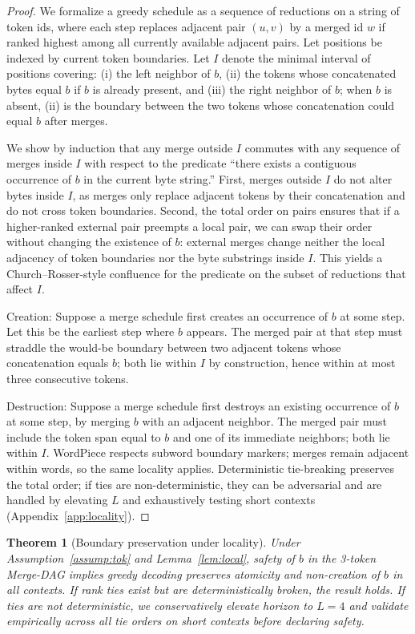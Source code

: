 \documentclass{article}
\newtheorem{theorem}{Theorem}
\begin{document}
\begin{proof}
We formalize a greedy schedule as a sequence of reductions on a string of token ids, where each step replaces adjacent pair $(u,v)$ by a merged id $w$ if ranked highest among all currently available adjacent pairs. Let positions be indexed by current token boundaries. Let $I$ denote the minimal interval of positions covering: (i) the left neighbor of $b$, (ii) the tokens whose concatenated bytes equal $b$ if $b$ is already present, and (iii) the right neighbor of $b$; when $b$ is absent, (ii) is the boundary between the two tokens whose concatenation could equal $b$ after merges.

We show by induction that any merge outside $I$ commutes with any sequence of merges inside $I$ with respect to the predicate “there exists a contiguous occurrence of $b$ in the current byte string.” First, merges outside $I$ do not alter bytes inside $I$, as merges only replace adjacent tokens by their concatenation and do not cross token boundaries. Second, the total order on pairs ensures that if a higher-ranked external pair preempts a local pair, we can swap their order without changing the existence of $b$: external merges change neither the local adjacency of token boundaries nor the byte substrings inside $I$. This yields a Church–Rosser-style confluence for the predicate on the subset of reductions that affect $I$. 

Creation: Suppose a merge schedule first creates an occurrence of $b$ at some step. Let this be the earliest step where $b$ appears. The merged pair at that step must straddle the would-be boundary between two adjacent tokens whose concatenation equals $b$; both lie within $I$ by construction, hence within at most three consecutive tokens.

Destruction: Suppose a merge schedule first destroys an existing occurrence of $b$ at some step, by merging $b$ with an adjacent neighbor. The merged pair must include the token span equal to $b$ and one of its immediate neighbors; both lie within $I$. WordPiece respects subword boundary markers; merges remain adjacent within words, so the same locality applies. Deterministic tie-breaking preserves the total order; if ties are non-deterministic, they can be adversarial and are handled by elevating $L$ and exhaustively testing short contexts (Appendix~\ref{app:locality}).
\end{proof}

\begin{theorem}[Boundary preservation under locality]\label{thm:bpe}
Under Assumption~\ref{assump:tok} and Lemma~\ref{lem:local}, safety of $b$ in the 3-token Merge-DAG implies greedy decoding preserves atomicity and non-creation of $b$ in all contexts. If rank ties exist but are deterministically broken, the result holds. If ties are not deterministic, we conservatively elevate horizon to $L=4$ and validate empirically across all tie orders on short contexts before declaring safety.
\end{theorem}
\end{document}
